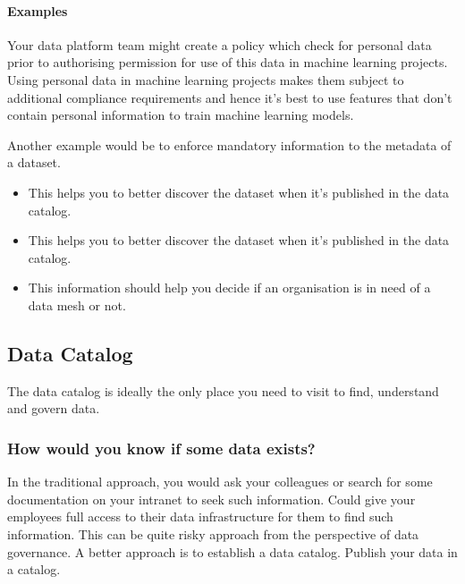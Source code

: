 \documentclass[a4paper, 11pt]{book}
\begin{document}
    \paragraph{Examples}
    Your data platform team might create a policy which check for personal data prior to authorising permission for use of this data in machine learning projects.
    Using personal data in machine learning projects makes them subject to additional compliance requirements and hence it's best to use features that don't contain personal information to train machine learning models.

    Another example would be to enforce mandatory information to the metadata of a dataset.
    \begin{itemize}
        \item This helps you to better discover the dataset when it's published in the data catalog.
        \item This helps you to better discover the dataset when it's published in the data catalog.
        \item This information should help you decide if an organisation is in need of a data mesh or not.
    \end{itemize}

    \subsection{Data Catalog}
    The data catalog is ideally the only place you need to visit to find, understand and govern data.

    \subsubsection{How would you know if some data exists?}
    In the traditional approach, you would ask your colleagues or search for some documentation on your intranet to seek such information.
    Could give your employees full access to their data infrastructure for them to find such information.
    This can be quite risky approach from the perspective of data governance.
    A better approach is to establish a data catalog.
    Publish your data in a catalog.
\end{document}
